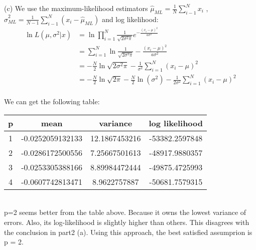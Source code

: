 \documentclass[paper=a4, fontsize=11pt]{scrartcl} %
\numberwithin{equation}{section} %
\numberwithin{figure}{section} %
\numberwithin{table}{section} %
\begin{document}
(c) We use the maximum-likelihood estimators $ \hat{\mu}_{ML} = \frac{1}{N}\sum_{i-1}^{N}x_i $ , $ \hat{\sigma}_{ML}^2 = \frac{1}{N-1}\sum_{i-1}^{N}(x_i - \hat{\mu}_{ML}) $ and log likelihood:\\
\begin{align*}
\ln L(\mu,\sigma^2|x) &= \ln\prod_{i=1}^{N}\frac{1}{\sqrt{2\sigma^2\pi}}e^{-\frac{(x_i-\mu)^2}{a\sigma^2}} \\
&= \sum_{i=1}^{N}\ln \frac{1}{\sqrt{2\sigma^2\pi}} - \frac{(x_i-\mu)^2}{a\sigma^2} \\
&= - \frac{N}{2}\ln\sqrt{2\sigma^2\pi} - \frac{1}{\sigma^2}\sum_{i=1}^{N}(x_i-\mu)^2 \\
&= - \frac{N}{2}\ln\sqrt{2\pi} - \frac{N}{2}\ln(\sigma^2) - \frac{1}{2\sigma^2}\sum_{i=1}^{N}(x_i-\mu)^2 \\
\end{align*}

We can get the following table: \\

\begin{tabular}{cccc}
	\hline
	p & mean & variance & log likelihood \\
	\hline
	1 & -0.0252059132133 & 12.1867453216 & -53382.2597848 \\
	2 & -0.0286172500556 & 7.25667501613 & -48917.9880357 \\
	3 & -0.0253305388166 & 8.89984472444 & -49875.4725993 \\
	4 & -0.0607742813471 & 8.9622757887 & -50681.7579315\\
	\hline
\end{tabular}

~~~\\
p=2 seems better from the table above. Because it owns the lowest variance of errors. Also, its log-likelihood is slightly higher than others. This disagrees with the conclusion in part2 (a). Using this approach, the best satisfied assumprion is p = 2. 








\end{document}
